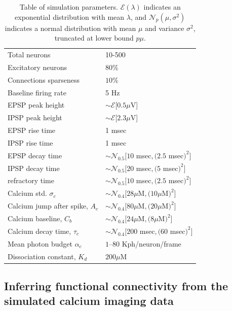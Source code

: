 \begin{table}[h!b!p!]
\caption{Table of simulation parameters. $\mathcal{E}(\lambda)$ indicates an exponential distribution with mean $\lambda$, and $\mathcal{N}_p(\mu,\sigma^2)$ indicates a normal distribution with mean $\mu$ and variance $\sigma^2$, truncated at lower bound $p\mu$.}\label{table:caparm}

\begin{tabular}{ll}
\hline
Total neurons & 10-500 \\
Excitatory neurons & $80\%$ \\
Connections sparseness & $10\%$ \\
Baseline firing rate & 5 Hz\\
\hline
EPSP peak height 	& $\sim \mathcal{E}[0.5 \mu$V] \\
IPSP peak height 	& $\sim \mathcal{E}[2.3 \mu$V] \\
EPSP rise time 		& 1 msec \\
IPSP rise time 		& 1 msec \\
EPSP decay time 	& $\sim \mathcal{N}_{0.5}[10 $ msec$,(2.5 $ msec$)^2]$ \\
IPSP decay time 	& $\sim \mathcal{N}_{0.5}[20 $ msec$,(5 $ msec$)^2]$ \\
refractory time 	& $\sim \mathcal{N}_{0.5}[10 $ msec$,(2.5 $ msec$)^2]$ \\
\hline
Calcium std. $\sigma_c$ & $\sim \mathcal{N}_{0.4}[28\mu$M$,(10\mu$M$)^2]$ \\
Calcium jump after spike, $A_c$ &  $\sim \mathcal{N}_{0.4}[80\mu$M$,(20\mu$M$)^2]$\\
Calcium baseline, $C_b$ & $\sim \mathcal{N}_{0.4}[24\mu$M$,(8\mu$M$)^2]$ \\
Calcium decay time, $\tau_c$ & $\sim \mathcal{N}_{0.4}[200 $ msec$,(60 $ msec$)^2]$ \\
Mean photon budget $\alpha_c$ & $1$--$80$ Kph/neuron/frame \\
Dissociation constant, $K_d$ & $200 \mu$M \\
\hline
\end{tabular}
\end{table}


\subsection{Inferring functional connectivity from the simulated calcium imaging data} \label{sec:results:inference}

